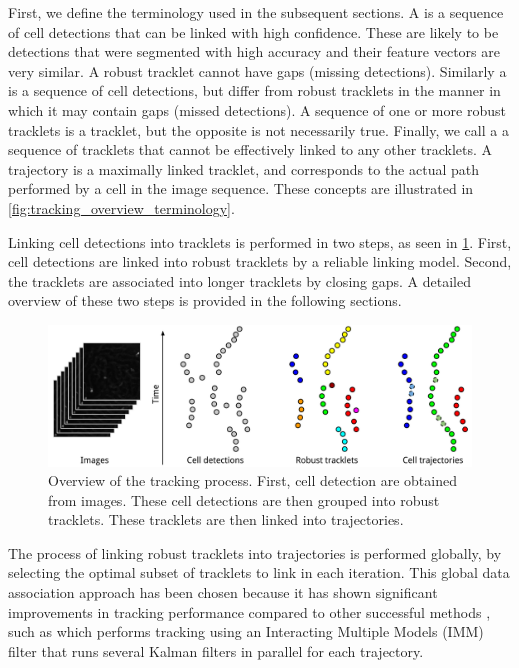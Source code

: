 		First, we define the terminology used in the subsequent sections. A  is a sequence of cell detections that can be linked with high confidence. These are likely to be detections that were segmented with high accuracy and their feature vectors are very similar. A robust tracklet cannot have gaps (missing detections). Similarly a  is a sequence of cell detections, but differ from robust tracklets in the manner in which it may contain gaps (missed detections). A sequence of one or more robust tracklets is a tracklet, but the opposite is not necessarily true. Finally, we call a  a sequence of tracklets that cannot be effectively linked to any other tracklets. A trajectory is a maximally linked tracklet, and corresponds to the actual path performed by a cell in the image sequence. These concepts are illustrated in \cref{fig:tracking_overview_terminology}.
		
		Linking cell detections into tracklets is performed in two steps, as seen in \cref{fig:tracking_process_overiew}. First, cell detections are linked into robust tracklets by a reliable linking model. Second, the tracklets are associated into longer tracklets by closing gaps. A detailed overview of these two steps is provided in the following sections.
	
		\begin{figure}[h]
			\centering
			\includegraphics[width=\textwidth]{images/fig_tracking_process_overiew}
			\caption{Overview of the tracking process. First, cell detection are obtained from images. These cell detections are then grouped into robust tracklets. These tracklets are then linked into trajectories.}
			\label{fig:tracking_process_overiew}
		\end{figure}
		
		The process of linking robust tracklets into trajectories is performed globally, by selecting the optimal subset of tracklets to link in each iteration. This global data association approach has been chosen because it has shown significant improvements in tracking performance compared to other successful methods \cite{bise11global}, such as \cite{li08} which performs tracking using an Interacting Multiple Models (IMM) filter that runs several Kalman filters in parallel for each trajectory.
		
